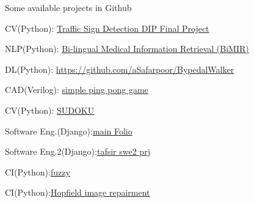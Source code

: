 

\begin{cventries}

  \cventry
    {Some available projects in Github} %
    {} %
    {} %
    {} %
    {
      \begin{cvitems} %
        \item CV(Python): \href{https://github.com/aSafarpoor/Traffic-Sign-Detection-DIPFinalProject}{Traffic Sign Detection DIP Final Project}
        \item NLP(Python): \href{https://github.com/aSafarpoor/BiMIR}{Bi-lingual Medical Information Retrieval (BiMIR)}
        \item DL(Python): \href{https://github.com/aSafarpoor/AI_Project_BypedalWalker}{https://github.com/aSafarpoor/BypedalWalker}
        \item CAD(Verilog): \href{https://github.com/aSafarpoor/simple_ping_pong_game}{simple ping pong game}
        \item CV(Python): \href{https://github.com/aSafarpoor/cv_final_project-SUDOKU}{SUDOKU}
        \item Software Eng.(Django):\href{https://github.com/alidehestani76/main_Folio}{main Folio}
        \item Software Eng.2(Django):\href{https://github.com/aSafarpoor/tafsir-swe2-prj}{tafsir swe2 prj}
        \item CI(Python):\href{https://github.com/aSafarpoor/fuzzy}{fuzzy}
        \item CI(Python):\href{https://github.com/aSafarpoor/hopfield-image-repairment}{Hopfield image repairment}
      \end{cvitems}
    }


  
\end{cventries}
